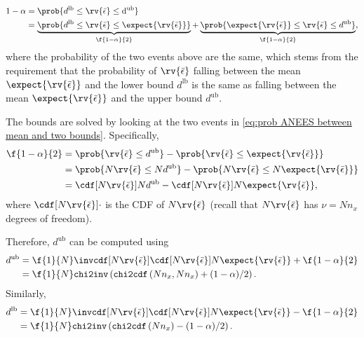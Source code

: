 \documentclass{simple-article}
\begin{document}
\begin{align}
  1 - \alpha 
        &= \prob{d^{\mathrm{lb}} \leq \rv{\bar{\epsilon}}\leq \mathrm{d}^{\mathrm{ub}}}\\
        &= 
        \label{eq:prob ANEES between mean and two bounds}
        \underbrace{\prob{d^{\mathrm{lb}} \leq \rv{\bar{\epsilon}} \leq \expect{\rv{\bar{\epsilon}}}}}_{\f{1-\alpha}{2}} +
        \underbrace{\prob{ \expect{\rv{\bar{\epsilon}}} \leq \rv{\bar{\epsilon}} \leq d^{\mathrm{ub}}}}_{\f{1-\alpha}{2}},
\end{align}
where the probability of the two events above are the same, which stems from the requirement that the probability of $\rv{\bar{\epsilon}}$ falling between the mean $\expect{\rv{\bar{\epsilon}}}$ and the lower bound $d^{\mathrm{lb}}$ is the same as falling between the mean $\expect{\rv{\bar{\epsilon}}}$ and the upper bound $d^{\mathrm{ub}}$.

The bounds are solved by looking at the two events in \eqref{eq:prob ANEES between mean and two bounds}. Specifically,
\begin{align}
  \f{1-\alpha}{2} 
        &= \prob{\rv{\bar{\epsilon}} \leq d^{\mathrm{ub}}} - \prob{\rv{\bar{\epsilon}} \leq  \expect{\rv{\bar{\epsilon}}}}\\
        &= \prob{N\rv{\bar{\epsilon}} \leq Nd^{\mathrm{ub}}} - \prob{N\rv{\bar{\epsilon}} \leq  N\expect{\rv{\bar{\epsilon}}}}\\
        &= \cdf[N\rv{\bar{\epsilon}} ]{Nd^{\mathrm{ub}}} - \cdf[N\rv{\bar{\epsilon}}]{N\expect{\rv{\bar{\epsilon}}}},
\end{align}
where $\cdf[N\rv{\bar{\epsilon}} ]{\cdot}$ is the CDF of $N\rv{\bar{\epsilon}}$ (recall that $N\rv{\bar{\epsilon}}$ has $\nu = Nn_{x}$ degrees of freedom). 
\begin{blueBox}
  Therefore, $d^{\mathrm{ub}}$ can be computed using
  \begin{align}
    \label{eq:upper bound expression Chi2}
    d^{\mathrm{ub}} 
            &= \f{1}{N}\invcdf[N\rv{\bar{\epsilon}}]{\cdf[N\rv{\bar{\epsilon}}]{N\expect{\rv{\bar{\epsilon}}}} + \f{1-\alpha}{2}}\\
            &= \f{1}{N}\texttt{chi2inv}\left(\texttt{chi2cdf}\left( Nn_{x}, Nn_{x} \right) + (1-\alpha)/2\right).
  \end{align}
  Similarly,
  \begin{align}
    \label{eq:lower bound expression Chi2}
    d^{\mathrm{lb}} &= \f{1}{N}\invcdf[N\rv{\bar{\epsilon}}]{\cdf[N\rv{\bar{\epsilon}}]{N\expect{\rv{\bar{\epsilon}}}} - \f{1-\alpha}{2}}\\
                    &= \f{1}{N}\texttt{chi2inv}\left(\texttt{chi2cdf}\left( Nn_{x} \right)  - (1-\alpha)/2\right).
  \end{align}
\end{blueBox}
\end{document}
